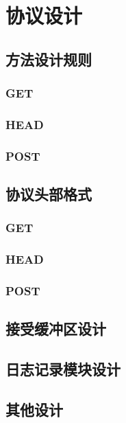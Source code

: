 \chapter{协议设计}

\section{方法设计规则}

\subsection{GET}

\subsection{HEAD}

\subsection{POST}



\section{协议头部格式}

\subsection{GET}

\subsection{HEAD}

\subsection{POST}

\section{接受缓冲区设计}

\section{日志记录模块设计}

\section{其他设计}

